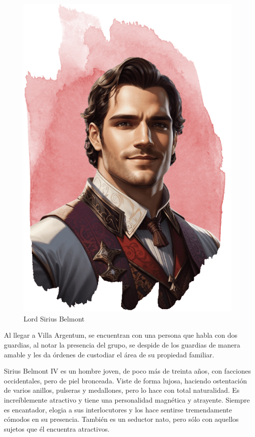 \documentclass[10pt,twoside,twocolumn,openany]{dndbook}
\begin{document}
\begin{figure}
  \centering
  \includegraphics[width=0.9\columnwidth]{media/sirius-belmont.png}
  \caption{Lord Sirius Belmont}
\end{figure}

Al llegar a Villa Argentum, se encuentran con una persona que habla con dos guardias, al notar 
la presencia del grupo, se despide de los guardias de manera amable y les da órdenes de custodiar 
el área de su propiedad familiar.

\begin{DndReadAloud}
  Sirius Belmont IV es un hombre joven, de poco más de treinta años, con facciones occidentales, 
  pero de piel bronceada. Viste de forma lujosa, haciendo ostentación de varios anillos, 
  pulseras y medallones, pero lo hace con total naturalidad. Es increíblemente atractivo y 
  tiene una personalidad magnética y atrayente. Siempre es encantador, elogia a sus 
  interlocutores y los hace sentirse tremendamente cómodos en su presencia. También es un 
  seductor nato, pero sólo con aquellos sujetos que él encuentra atractivos.
\end{DndReadAloud}
\end{document}
